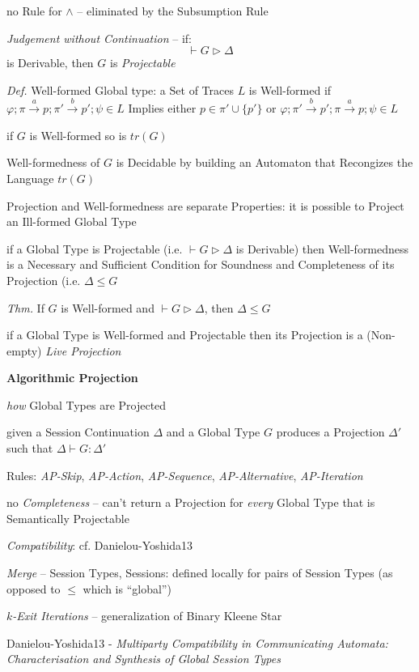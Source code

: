 no Rule for $\wedge$ -- eliminated by the Subsumption Rule

\emph{Judgement without Continuation} -- if:
\[
  \vdash G \rhd \Delta
\]
is Derivable, then $G$ is \emph{Projectable}

\emph{Def.} Well-formed Global type: a Set of Traces $L$ is
Well-formed if $\varphi; \pi \xrightarrow{a} p; \pi' \xrightarrow{b}
p'; \psi \in L$ Implies either $p \in \pi' \cup \{p'\}$ or $\varphi;
\pi' \xrightarrow{b} p'; \pi \xrightarrow{a} p; \psi \in L$

if $G$ is Well-formed so is $tr(G)$

Well-formedness of $G$ is Decidable by building an Automaton that
Recongizes the Language $tr(G)$

Projection and Well-formedness are separate Properties: it is possible
to Project an Ill-formed Global Type

if a Global Type is Projectable (i.e. $\vdash G \rhd \Delta$ is
Derivable) then Well-formedness is a Necessary and Sufficient
Condition for Soundness and Completeness of its Projection (i.e.
$\Delta \leq G$

\emph{Thm.} If $G$ is Well-formed and $\vdash G \rhd \Delta$, then
$\Delta \leq G$

if a Global Type is Well-formed and Projectable then its Projection is
a (Non-empty) \emph{Live Projection}


\textbf{Algorithmic Projection}

\emph{how} Global Types are Projected

given a Session Continuation $\Delta$ and a Global Type $G$ produces a
Projection $\Delta'$ such that $\Delta \vdash G : \Delta'$

Rules: \emph{AP-Skip}, \emph{AP-Action}, \emph{AP-Sequence},
\emph{AP-Alternative}, \emph{AP-Iteration}

no \emph{Completeness} -- can't return a Projection for \emph{every}
Global Type that is Semantically Projectable

\emph{Compatibility}: cf. Danielou-Yoshida13 %

\emph{Merge} -- Session Types, Sessions: defined locally for pairs of
Session Types (as opposed to $\leq$ which is ``global'')

\emph{$k$-Exit Iterations} -- generalization of Binary Kleene Star


\asterism


Danielou-Yoshida13 - \emph{Multiparty Compatibility in Communicating
  Automata: Characterisation and Synthesis of Global Session Types}

